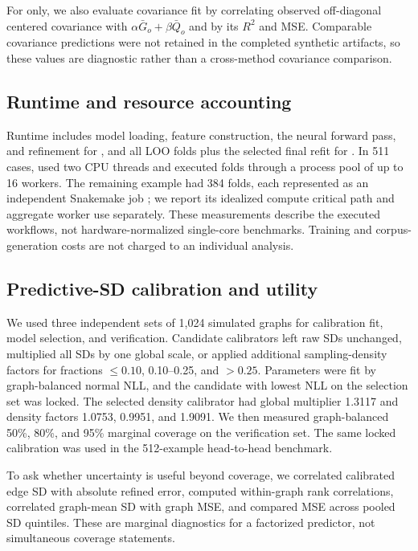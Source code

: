 For \dreems only, we also evaluate covariance fit by correlating observed
off-diagonal centered covariance with $\alpha\bar G_o+\beta\bar Q_o$ and by
its $R^2$ and MSE. Comparable covariance predictions were not retained in the
completed synthetic \feems artifacts, so these values are diagnostic rather
than a cross-method covariance comparison.

\subsection{Runtime and resource accounting}

Runtime includes model loading, feature construction, the neural forward pass,
and refinement for \dreems, and all LOO folds plus the selected final refit for
\feems. In 511 cases, \dreems used two CPU threads and \feems executed folds
through a process pool of up to 16 workers. The remaining example had 384
\feems folds, each represented as an independent Snakemake job
\citep{koster2012snakemake}; we report its idealized compute critical path and
aggregate worker use separately. These measurements describe the executed
workflows, not hardware-normalized single-core benchmarks. Training and
corpus-generation costs are not charged to an individual \dreems analysis.

\subsection{Predictive-SD calibration and utility}

We used three independent sets of 1,024 simulated graphs for calibration fit,
model selection, and verification. Candidate calibrators left raw SDs
unchanged, multiplied all SDs by one global scale, or applied additional
sampling-density factors for fractions $\leq0.10$, 0.10--0.25, and $>0.25$.
Parameters were fit by graph-balanced normal NLL, and the candidate with
lowest NLL on the selection set was locked. The selected density calibrator
had global multiplier 1.3117 and density factors 1.0753, 0.9951, and 1.9091.
We then measured graph-balanced 50\%, 80\%, and 95\% marginal coverage on the
verification set. The same locked calibration was used in the 512-example
head-to-head benchmark.

To ask whether uncertainty is useful beyond coverage, we correlated calibrated
edge SD with absolute refined error, computed within-graph rank correlations,
correlated graph-mean SD with graph MSE, and compared MSE across pooled SD
quintiles. These are marginal diagnostics for a factorized predictor, not
simultaneous coverage statements.

